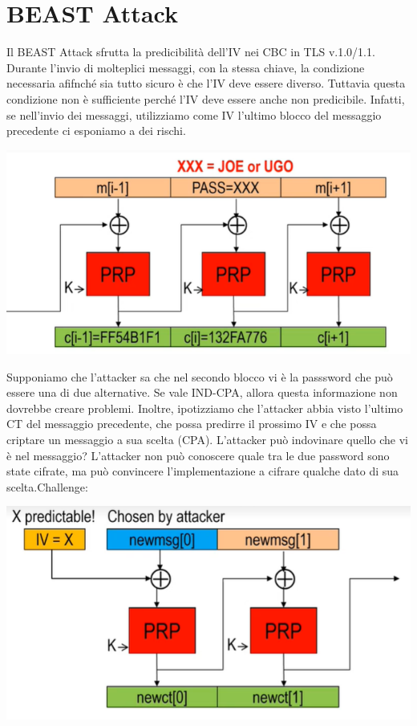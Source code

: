 \documentclass{book}
\theoremstyle{remark}
\begin{document}
\section{BEAST Attack}
Il BEAST Attack sfrutta la predicibilità dell'IV nei CBC in TLS v\@.1\@.0/1\@.1\@. Durante l'invio di molteplici messaggi, con la stessa chiave, la condizione necessaria afifnché sia tutto sicuro è che l'IV deve essere diverso\@. Tuttavia questa condizione non è sufficiente perché l'IV deve essere anche non predicibile\@.
Infatti, se nell'invio dei messaggi, utilizziamo come IV l'ultimo blocco del messaggio precedente ci esponiamo a dei rischi\@.
\begin{center}
	\includegraphics[scale=0.4]{BEAST1.png}
\end{center}
Supponiamo che l'attacker sa che nel secondo blocco vi è la passsword che può essere una di due alternative\@. Se vale IND-CPA, allora questa informazione non dovrebbe creare problemi\@. Inoltre, ipotizziamo che l'attacker abbia visto l'ultimo CT del messaggio precedente, che possa predirre il prossimo IV e che possa criptare un messaggio a sua scelta (CPA)\@. L'attacker può indovinare quello che vi è nel messaggio?\newline
L'attacker non può conoscere quale tra le due password sono state cifrate, ma può convincere l'implementazione a cifrare qualche dato di sua scelta\@.Challenge:\begin{center}
	\includegraphics[scale=0.4]{BEASTCHallenge.png}
\end{center}
\end{document}

